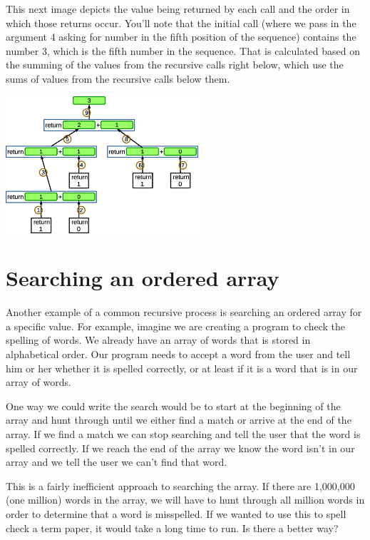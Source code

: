 This next image depicts the value being returned by each call and the order in which those returns occur. You'll note that the initial call (where we pass in the argument 4 asking for number in the fifth position of the sequence) contains the number 3, which is the fifth number in the sequence. That is calculated based on the summing of the values from the recursive calls right below, which use the sums of values from the recursive calls below them.

\beforefig
\centerline{\includegraphics[height=2in]{figs2/recursion-fibonacci-depiction-1.eps}}
\afterfig

\section{Searching an ordered array}

Another example of a common recursive process is searching an ordered array for a specific value. For example, imagine we are creating a program to check the spelling of words. We already have an array of words that is stored in alphabetical order. Our program needs to accept a word from the user and tell him or her whether it is spelled correctly, or at least if it is a word that is in our array of words.

One way we could write the search would be to start at the beginning of the array and hunt through until we either find a match or arrive at the end of the array. If we find a match we can stop searching and tell the user that the word is spelled correctly. If we reach the end of the array we know the word isn't in our array and we tell the user we can't find that word.

This is a fairly inefficient approach to searching the array. If there are 1,000,000 (one million) words in the array, we will have to hunt through all million words in order to determine that a word is misspelled. If we wanted to use this to spell check a term paper, it would take a long time to run. Is there a better way?

